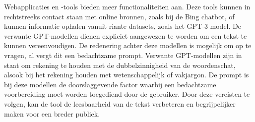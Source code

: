 \begin{table}[H]
	\centering
\end{table}

Webapplicaties en -tools bieden meer functionaliteiten aan. Deze tools kunnen in rechtstreeks contact staan met online bronnen, zoals bij de Bing chatbot, of kunnen informatie ophalen vanuit riante datasets, zoals het GPT-3 model. De verwante GPT-modellen dienen expliciet aangewezen te worden om een tekst te kunnen vereenvoudigen. De redenering achter deze modellen is mogelijk om op te vragen, al vergt dit een bedachtzame prompt. Verwante GPT-modellen zijn in staat om rekening te houden met de dubbelzinnigheid van de woordenschat, alsook bij het rekening houden met wetenschappelijk of vakjargon. De prompt is bij deze modellen de doorslaggevende factor waarbij een bedachtzame voorbereiding moet worden toegediend door de gebruiker. Door deze vereisten te volgen, kan de tool de leesbaarheid van de tekst verbeteren en begrijpelijker maken voor een breder publiek.

